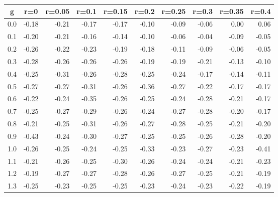 %
\begin{table}[!tbp]
 \begin{center}
 \begin{tabular}{rrrrrrrrrr}\hline\hline
\multicolumn{1}{c}{g}&\multicolumn{1}{c}{r=0}&\multicolumn{1}{c}{r=0.05}&\multicolumn{1}{c}{r=0.1}&\multicolumn{1}{c}{r=0.15}&\multicolumn{1}{c}{r=0.2}&\multicolumn{1}{c}{r=0.25}&\multicolumn{1}{c}{r=0.3}&\multicolumn{1}{c}{r=0.35}&\multicolumn{1}{c}{r=0.4}\tabularnewline
\hline
0.0&-0.18&-0.21&-0.17&-0.17&-0.10&-0.09&-0.06& 0.00& 0.06\tabularnewline
0.1&-0.20&-0.21&-0.16&-0.14&-0.10&-0.06&-0.04&-0.09&-0.05\tabularnewline
0.2&-0.26&-0.22&-0.23&-0.19&-0.18&-0.11&-0.09&-0.06&-0.05\tabularnewline
0.3&-0.28&-0.26&-0.26&-0.26&-0.19&-0.19&-0.21&-0.13&-0.10\tabularnewline
0.4&-0.25&-0.31&-0.26&-0.28&-0.25&-0.24&-0.17&-0.14&-0.11\tabularnewline
0.5&-0.27&-0.27&-0.31&-0.26&-0.36&-0.27&-0.22&-0.17&-0.17\tabularnewline
0.6&-0.22&-0.24&-0.35&-0.26&-0.25&-0.24&-0.28&-0.21&-0.17\tabularnewline
0.7&-0.25&-0.27&-0.29&-0.26&-0.24&-0.27&-0.28&-0.20&-0.17\tabularnewline
0.8&-0.21&-0.25&-0.31&-0.26&-0.27&-0.28&-0.25&-0.21&-0.20\tabularnewline
0.9&-0.43&-0.24&-0.30&-0.27&-0.25&-0.25&-0.26&-0.28&-0.20\tabularnewline
1.0&-0.26&-0.25&-0.24&-0.25&-0.33&-0.23&-0.27&-0.23&-0.41\tabularnewline
1.1&-0.21&-0.26&-0.25&-0.30&-0.26&-0.24&-0.24&-0.21&-0.23\tabularnewline
1.2&-0.19&-0.27&-0.27&-0.28&-0.26&-0.27&-0.25&-0.21&-0.19\tabularnewline
1.3&-0.25&-0.23&-0.25&-0.25&-0.23&-0.24&-0.23&-0.22&-0.19\tabularnewline
\hline
\end{tabular}

\end{center}

\end{table}

